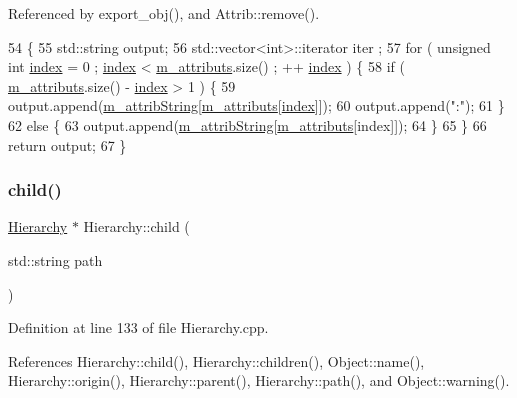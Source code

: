 Referenced by export\+\_\+obj(), and Attrib\+::remove().


\begin{DoxyCode}
54                             \{
55   std::string output;
56   std::vector<int>::iterator iter ;
57   \textcolor{keywordflow}{for} ( \textcolor{keywordtype}{unsigned} \textcolor{keywordtype}{int} \hyperlink{namespaceimages_a54407fd574970b3178647ae096321a57}{index} = 0 ; \hyperlink{namespaceimages_a54407fd574970b3178647ae096321a57}{index} < \hyperlink{classAttrib_ac4bd58a0cc6b38a3b711d609a3d3aacc}{m\_attributs}.size() ; ++
      \hyperlink{namespaceimages_a54407fd574970b3178647ae096321a57}{index} ) \{
58     \textcolor{keywordflow}{if} ( \hyperlink{classAttrib_ac4bd58a0cc6b38a3b711d609a3d3aacc}{m\_attributs}.size() - \hyperlink{namespaceimages_a54407fd574970b3178647ae096321a57}{index} > 1 ) \{
59       output.append(\hyperlink{classAttrib_a3414521d7a82476e874b25a5407b5e63}{m\_attribString}[\hyperlink{classAttrib_ac4bd58a0cc6b38a3b711d609a3d3aacc}{m\_attributs}[\hyperlink{namespaceimages_a54407fd574970b3178647ae096321a57}{index}]]);
60       output.append(\textcolor{stringliteral}{":"});
61     \}
62     \textcolor{keywordflow}{else} \{
63       output.append(\hyperlink{classAttrib_a3414521d7a82476e874b25a5407b5e63}{m\_attribString}[\hyperlink{classAttrib_ac4bd58a0cc6b38a3b711d609a3d3aacc}{m\_attributs}[index]]);
64     \}
65   \}
66   \textcolor{keywordflow}{return} output;
67 \}
\end{DoxyCode}
\mbox{\label{classHierarchy_a1e207f973c694b538bf90107b4868817}} 
\subsubsection{\texorpdfstring{child()}{child()}}
{\footnotesize\ttfamily \hyperlink{classHierarchy}{Hierarchy} $\ast$ Hierarchy\+::child (\begin{DoxyParamCaption}\item[{std\+::string}]{path }\end{DoxyParamCaption})\hspace{0.3cm}{\ttfamily [inherited]}}



Definition at line 133 of file Hierarchy.\+cpp.



References Hierarchy\+::child(), Hierarchy\+::children(), Object\+::name(), Hierarchy\+::origin(), Hierarchy\+::parent(), Hierarchy\+::path(), and Object\+::warning().




